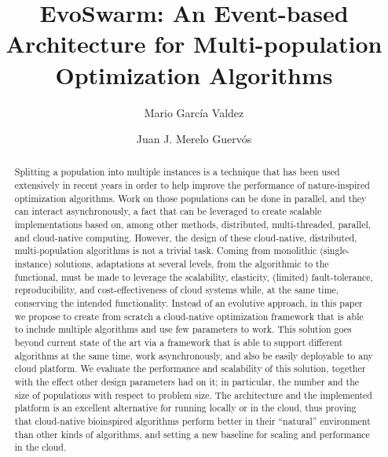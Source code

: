 \documentclass[review]{elsarticle}
\begin{document}
\lstset{language=Python} 
\begin{frontmatter}

  \title{EvoSwarm: An Event-based Architecture for Multi-population Optimization Algorithms}

\author[itt]{Mario Garc\'ia Valdez}

\author[granada]{Juan J. Merelo Guerv\'os}

\address[itt]{Department of Graduate Studies, Instituto Tecnol\'ogico de Tijuana, Tijuana BC, Mexico}
\address[granada]{Department of Computer Architecture and Technology, Universidad de Granada, Granada, Spain}

\begin{abstract} 
Splitting a population into multiple instances is a technique that has
been used extensively in recent years in order to help improve the
performance of nature-inspired optimization algorithms. Work on those
populations can be done in parallel, and they can interact asynchronously,
a fact that can be leveraged to create scalable implementations based
on, among other methods, distributed, multi-threaded, parallel, and
cloud-native computing.  However, the design of these cloud-native,
distributed, multi-population algorithms is not a trivial task. Coming
from monolithic (single-instance) solutions, adaptations at several
levels, from the algorithmic to the functional, must be made to
leverage the scalability, elasticity, (limited) fault-tolerance,
reproducibility, and cost-effectiveness of cloud systems while, at the
same time, conserving the intended functionality. Instead of an
evolutive approach, in this paper we propose to create from scratch a
cloud-native optimization framework that is able to include multiple
algorithms and use few parameters to work. This solution goes beyond
current state of the art via a framework that is able to support
different algorithms at the same time, work asynchronously, and also
be easily deployable to any cloud platform. We evaluate the
performance and scalability of this solution, together with the effect
other design parameters had on it; in particular, the number and the
size of populations with respect to problem size. The architecture and
the implemented platform is an excellent alternative for running
locally or in the cloud, thus proving that cloud-native bioinspired
algorithms perform better in their ``natural'' environment than other
kinds of algorithms, %
and setting a new baseline for scaling and
performance in the cloud.
\end{abstract}


\end{frontmatter}
\end{document}

